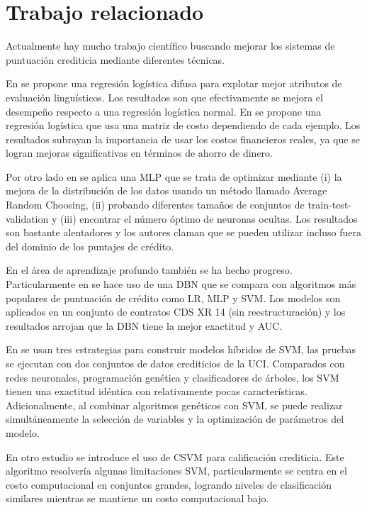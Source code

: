 \section{Trabajo relacionado}

Actualmente hay mucho trabajo científico buscando mejorar los sistemas de puntuación crediticia mediante diferentes técnicas.

En \cite{sohn2016technology} se propone una regresión logística difusa para explotar mejor atributos de evaluación linguísticos. Los resultados son que efectivamente se mejora el desempeño respecto a una regresión logística normal. En \cite{bahnsen2014example} se propone una regresión logística que usa una matriz de costo dependiendo de cada ejemplo. Los resultados subrayan la importancia de usar los costos financieros reales, ya que se logran mejoras significativas en términos de ahorro de dinero.

Por otro lado en \cite{zhao2015investigation} se aplica una \ac{MLP} que se trata de optimizar mediante (i) la mejora de la distribución de los datos usando un método llamado Average Random Choosing, (ii) probando diferentes tamaños de conjuntos de train-test-validation y (iii) encontrar el número óptimo de neuronas ocultas. Los resultados son bastante alentadores y los autores claman que se pueden utilizar incluso fuera del dominio de los puntajes de crédito.

En el área de aprendizaje profundo también se ha hecho progreso. Particularmente en \cite{luo2017deep} se hace uso de una \ac{DBN} que se compara con algoritmos más populares de puntuación de crédito como \ac{LR}, \ac{MLP} y \ac{SVM}. Los modelos son aplicados en un conjunto de contratos CDS XR 14 (sin reestructuración) y los resultados arrojan que la \ac{DBN} tiene la mejor exactitud y AUC.

En \cite{huang2007credit} se usan tres estrategias para construir modelos híbridos de \ac{SVM}, las pruebas se ejecutan con dos conjuntos de datos crediticios de la UCI. Comparados con redes neuronales, programación genética y clasificadores de árboles, los \ac{SVM} tienen una exactitud idéntica con relativamente pocas características. Adicionalmente, al combinar algoritmos genéticos con \ac{SVM}, se puede realizar simultáneamente la selección de variables y la optimización de parámetros del modelo. 

En otro estudio \cite{harris2015credit} se introduce el uso de \ac{CSVM} para calificación crediticia. Este algoritmo resolvería algunas limitaciones \ac{SVM}, particularmente se centra en el costo computacional en conjuntos grandes, logrando niveles de clasificación similares mientras se mantiene un costo computacional bajo.

